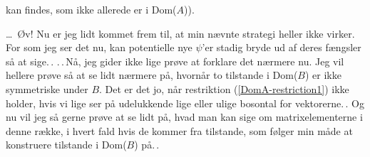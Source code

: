 \documentclass{report}
\begin{document}
kan findes, som ikke allerede er i Dom($A$)). 


\ldots\ Øv! Nu er jeg lidt kommet frem til, at min nævnte strategi heller ikke virker. For som jeg ser det nu, kan potentielle nye $\psi$'er stadig bryde ud af deres fængsler så at sige.\,. .\,.\,Nå, jeg gider ikke lige prøve at forklare det nærmere nu. Jeg vil hellere prøve så at se lidt nærmere på, hvornår to tilstande i Dom($B$) er ikke symmetriske under $B$. Det er det jo, når restriktion (\ref{DomA-restriction1}) ikke holder, hvis vi lige ser på udelukkende lige eller ulige bosontal for vektorerne.\,. Og nu vil jeg så gerne prøve at se lidt på, hvad man kan sige om matrixelementerne i denne række, i hvert fald hvis de kommer fra tilstande, som følger min måde at konstruere tilstande i Dom($B$) på.\,. 
\end{document}
